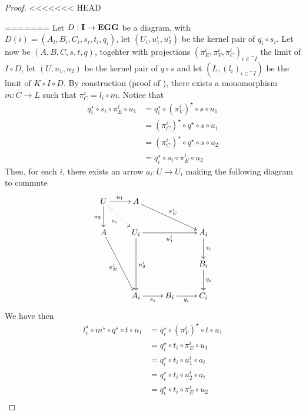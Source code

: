 \begin{proof}
<<<<<<< HEAD
	
=======
        Let $D: \mathbf{I} \to \textbf{\textup{EGG}}$ be a diagram, with $D(i) = (A_i, B_i, C_i, s_i, t_i, q_i)$, let $(U_i, u_1^i, u_2^i)$ be the kernel pair of $q_i\circ s_i$.
	Let now be $(A, B, C, s, t, q)$, togehter with projections $(\pi_E^i, \pi_V^i, \pi_C^i)_{i \in \cat I}$ the limit of $I \circ D$,
	let $(U, u_1, u_2)$ be the kernel pair of $q\circ s$ and let $(L, (l_i)_{i \in \cat I})$ be the limit of $K \circ I \circ D$.
        By construction (proof of ), there exists a monomorphism $m: C \to L$ such that $\pi_C^i = l_i \circ m$. Notice that
        \begin{align*}
                q_i^\star \circ s_i\circ \pi^i_E\circ u_1      &= q_i^\star\circ (\pi^i_V)^\star \circ s\circ u_1\\
                                                        &= (\pi_C^i)^\star\circ q^\star\circ s\circ u_1\\
                                                        &=(\pi_C^i)^\star\circ q^\star\circ s\circ u_2\\
                                                        &= q_i^\star \circ s_i \circ \pi_E^i \circ u_2
        \end{align*}
        Then, for each $i$, there exists an arrow $a_i:U\to U_i$ making the following diagram to commute
	\[
                \xymatrix{
			U \ar[r]^{u_1} \ar[d]_{u_2} \ar@{.>}[dr]_{a_i} & A \ar[drr]^{\pi_E^i} && \\
			A \ar[ddr]_{\pi_E^i} & U_i \ar[rr]_{u_1^i} \ar[dd]^{u_2^i}&& A_i \ar[d]^{s_i} \\
					     & & & B_i \ar[d]^{q_i}\\
					     & A_i \ar[r]_{s_i} & B_i \ar[r]_{q_i}& C_i
                }
        \]
        We have then
        \begin{align*}
                l_i^\star\circ m^\star \circ q^\star \circ t \circ u_1    &= q_i^\star\circ (\pi_V^i)^\star \circ t \circ u_1 \\
                                                        &= q_i^\star \circ t_i \circ \pi_E^i \circ u_1 \\
                                                        &= q_i^\star \circ t_i \circ u_1^i \circ a_i \\
                                                        &= q_i^\star \circ t_i \circ u_2^i \circ a_i \\
                                                        &= q_i^\star \circ t_i \circ \pi_E^i \circ u_2 \\

\end{align*}
\end{proof}
